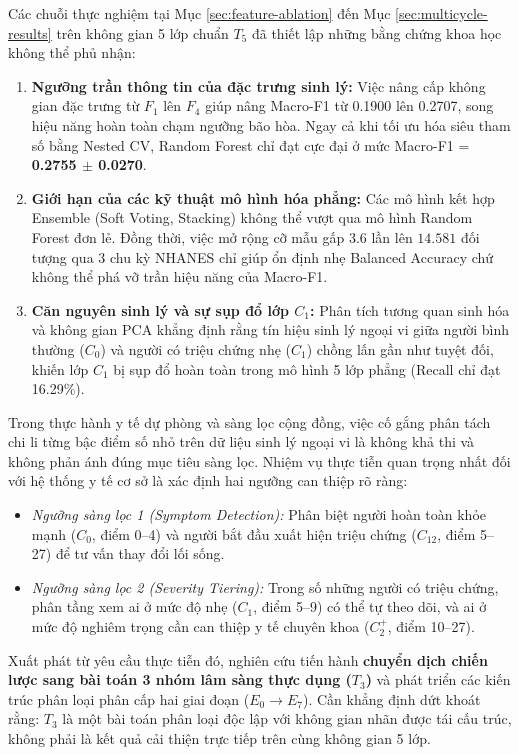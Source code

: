 Các chuỗi thực nghiệm tại Mục \ref{sec:feature-ablation} đến Mục \ref{sec:multicycle-results} trên không gian 5 lớp chuẩn $T_5$ đã thiết lập những bằng chứng khoa học không thể phủ nhận:
\begin{enumerate}
    \item \textbf{Ngưỡng trần thông tin của đặc trưng sinh lý:} Việc nâng cấp không gian đặc trưng từ $F_1$ lên $F_4$ giúp nâng Macro-F1 từ 0.1900 lên 0.2707, song hiệu năng hoàn toàn chạm ngưỡng bão hòa. Ngay cả khi tối ưu hóa siêu tham số bằng Nested CV, Random Forest chỉ đạt cực đại ở mức Macro-F1 = \textbf{0.2755 $\pm$ 0.0270}.
    \item \textbf{Giới hạn của các kỹ thuật mô hình hóa phẳng:} Các mô hình kết hợp Ensemble (Soft Voting, Stacking) không thể vượt qua mô hình Random Forest đơn lẻ. Đồng thời, việc mở rộng cỡ mẫu gấp 3.6 lần lên $14.581$ đối tượng qua 3 chu kỳ NHANES chỉ giúp ổn định nhẹ Balanced Accuracy chứ không thể phá vỡ trần hiệu năng của Macro-F1.
    \item \textbf{Căn nguyên sinh lý và sự sụp đổ lớp $C_1$:} Phân tích tương quan sinh hóa và không gian PCA khẳng định rằng tín hiệu sinh lý ngoại vi giữa người bình thường ($C_0$) và người có triệu chứng nhẹ ($C_1$) chồng lấn gần như tuyệt đối, khiến lớp $C_1$ bị sụp đổ hoàn toàn trong mô hình 5 lớp phẳng (Recall chỉ đạt 16.29\%).
\end{enumerate}

Trong thực hành y tế dự phòng và sàng lọc cộng đồng, việc cố gắng phân tách chi li từng bậc điểm số nhỏ trên dữ liệu sinh lý ngoại vi là không khả thi và không phản ánh đúng mục tiêu sàng lọc. Nhiệm vụ thực tiễn quan trọng nhất đối với hệ thống y tế cơ sở là xác định hai ngưỡng can thiệp rõ ràng:
\begin{itemize}
    \item \textit{Ngưỡng sàng lọc 1 (Symptom Detection):} Phân biệt người hoàn toàn khỏe mạnh ($C_0$, điểm 0--4) và người bắt đầu xuất hiện triệu chứng ($C_{12}$, điểm 5--27) để tư vấn thay đổi lối sống.
    \item \textit{Ngưỡng sàng lọc 2 (Severity Tiering):} Trong số những người có triệu chứng, phân tầng xem ai ở mức độ nhẹ ($C_1$, điểm 5--9) có thể tự theo dõi, và ai ở mức độ nghiêm trọng cần can thiệp y tế chuyên khoa ($C_2^+$, điểm 10--27).
\end{itemize}

Xuất phát từ yêu cầu thực tiễn đó, nghiên cứu tiến hành \textbf{chuyển dịch chiến lược sang bài toán 3 nhóm lâm sàng thực dụng ($T_3$)} và phát triển các kiến trúc phân loại phân cấp hai giai đoạn ($E_0 \to E_7$). Cần khẳng định dứt khoát rằng: $T_3$ là một bài toán phân loại độc lập với không gian nhãn được tái cấu trúc, không phải là kết quả cải thiện trực tiếp trên cùng không gian 5 lớp.

